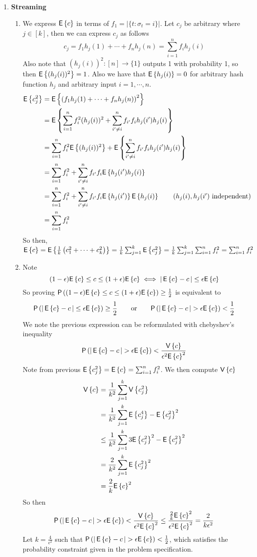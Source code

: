 \documentclass[11pt]{article}
\begin{document}
\begin{enumerate}
\newpage 

\item \textbf{Streaming}
\begin{enumerate}
\item We express $\mathsf{E}\left\{c\right\}$ in terms of $f_1 = |\{t:\sigma_t = i\}|$. Let $c_j$ be arbitrary where $j\in [k]$, then we can express $c_j$ as follows 
\[
    c_j = f_1 h_j(1) + \cdots + f_n h_j(n) = \sum_{i=1}^n f_i h_j(i)
\]
Also note that $(h_j(i))^2: [n]\rightarrow \{1\}$ outputs 1 with probability 1, so then $\mathsf{E}\left\{(h_j(i))^2\right\}=1$. Also we have that $\mathsf{E}\left\{h_j(i)\right\} = 0$ for arbitrary hash function $h_j$ and arbitrary input $i=1,\cdots,n$.
\begin{align*}
    \mathsf{E}\left\{c_j^2\right\} &= \mathsf{E}\left\{\left(f_1 h_j(1) + \cdots + f_n h_j(n)\right)^2\right\} \\ 
    &= \mathsf{E}\left\{ \sum_{i=1}^n f_i^2 (h_j(i))^2 + \sum_{i'\neq i}^n f_{i'} f_i h_j(i') h_j(i) \right\} \\ 
    &= \sum_{i=1}^n f_i^2 \mathsf{E}\left\{(h_j(i))^2\right\} + \mathsf{E}\left\{ \sum_{i'\neq i}^n f_{i'} f_i h_j(i')h_j(i)\right\} \\ 
    &= \sum_{i=1}^n f_i^2 + \sum_{i'\neq i}^n f_{i'} f_i \mathsf{E}\left\{h_j(i')h_j(i)\right\}\\
    &= \sum_{i=1}^n f_i^2 + \sum_{i'\neq i}^n f_{i'} f_i \mathsf{E}\left\{h_j(i')\right\}\mathsf{E}\left\{h_j(i)\right\} \tag{$h_j(i),h_j(i')$ independent}\\ 
    &= \sum_{i=1}^n f_i^2\\
\end{align*}
So then, $ \mathsf{E}\left\{c\right\} = \mathsf{E}\left\{\frac{1}{k}\left( c_1^2 + \cdots + c_k^2 \right)\right\} = \frac{1}{k} \sum_{j=1}^k \mathsf{E}\left\{c_j^2\right\} = \frac{1}{k} \sum_{j=1}^k \sum_{i=1}^n f_i^2 = \sum_{i=1}^n f_i^2$
\item Note 
\[
    (1-\epsilon)\mathsf{E}\left\{c\right\} \leq c \leq (1+\epsilon)\mathsf{E}\left\{c\right\}
    \iff
    \left|\,\mathsf{E}\left\{c\right\}-c\,\right| \leq \epsilon\mathsf{E}\left\{c\right\}
\]
So proving $\mathsf{P}\left((1-\epsilon)\mathsf{E}\left\{c\right\} \leq c \leq (1+\epsilon)\mathsf{E}\left\{c\right\}\right) \geq \frac{1}{2}$ is equivalent to 
\[
    \mathsf{P}\left(\left|\,\mathsf{E}\left\{c\right\}-c\,\right| \leq \epsilon\mathsf{E}\left\{c\right\}\right) \geq \frac{1}{2}
    \qquad \text{or} \qquad 
    \mathsf{P}\left(\left|\,\mathsf{E}\left\{c\right\}-c\,\right| > \epsilon\mathsf{E}\left\{c\right\}\right) < \frac{1}{2}
\]
We note the previous expression can be reformulated with chebyshev's inequality
\[
    \mathsf{P}\left(\left|\,\mathsf{E}\left\{c\right\}-c\,\right| > \epsilon\mathsf{E}\left\{c\right\}\right) < \frac{\mathsf{V}\left\{c\right\}}{\epsilon^2 \mathsf{E}\left\{c\right\}^2}
\]
Note from previous $\mathsf{E}\left\{c_j^2\right\} = \mathsf{E}\left\{c\right\} = \sum_{i=1}^n f_i^2$. We then compute $\mathsf{V}\left\{c\right\}$
\begin{align*}
    \mathsf{V}\left\{c\right\} 
    &= \frac{1}{k^2} \sum_{j=1}^k \mathsf{V}\left\{c_j^2\right\} \\
    &= \frac{1}{k^2} \sum_{j=1}^k \mathsf{E}\left\{c_j^4\right\} - \mathsf{E}\left\{c_j^2\right\}^2 \\
    &\leq \frac{1}{k^2} \sum_{j=1}^k 3\mathsf{E}\left\{c_j^2\right\}^2 - \mathsf{E}\left\{c_j^2\right\}^2 \\
    &= \frac{2}{k^2} \sum_{j=1}^k \mathsf{E}\left\{c_j^2\right\}^2 \\ 
    &= \frac{2}{k} \mathsf{E}\left\{c\right\}^2 \\ 
\end{align*}
So then 
\[
    \mathsf{P}\left(\left|\,\mathsf{E}\left\{c\right\}-c\,\right| > \epsilon\mathsf{E}\left\{c\right\}\right) < \frac{\mathsf{V}\left\{c\right\}}{\epsilon^2 \mathsf{E}\left\{c\right\}^2} \leq \frac{ \frac{2}{k} \mathsf{E}\left\{c\right\}^2 }{\epsilon^2 \mathsf{E}\left\{c\right\}^2} = \frac{2}{k \epsilon^2}
\]
Let $k = \frac{4}{\epsilon^2}$ such that $\mathsf{P}\left(\left|\,\mathsf{E}\left\{c\right\}-c\,\right| > \epsilon\mathsf{E}\left\{c\right\}\right) < \frac{1}{2}$, which satisfies the probability constraint given in the problem specification. 


\end{enumerate}
\end{enumerate}
\end{document}
